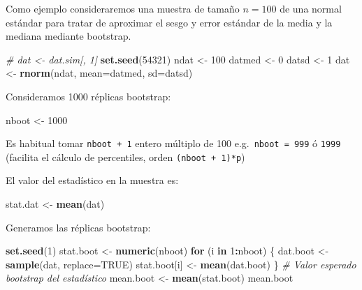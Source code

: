 \documentclass[
]{book}
\newenvironment{Shaded}{\begin{snugshade}}{\end{snugshade}}
\newcommand{\CommentTok}[1]{\textcolor[rgb]{0.56,0.35,0.01}{\textit{#1}}}
\newcommand{\ControlFlowTok}[1]{\textcolor[rgb]{0.13,0.29,0.53}{\textbf{#1}}}
\newcommand{\DataTypeTok}[1]{\textcolor[rgb]{0.13,0.29,0.53}{#1}}
\newcommand{\DecValTok}[1]{\textcolor[rgb]{0.00,0.00,0.81}{#1}}
\newcommand{\KeywordTok}[1]{\textcolor[rgb]{0.13,0.29,0.53}{\textbf{#1}}}
\newcommand{\NormalTok}[1]{#1}
\newcommand{\OperatorTok}[1]{\textcolor[rgb]{0.81,0.36,0.00}{\textbf{#1}}}
\newcommand{\OtherTok}[1]{\textcolor[rgb]{0.56,0.35,0.01}{#1}}
\newcommand{\StringTok}[1]{\textcolor[rgb]{0.31,0.60,0.02}{#1}}
\theoremstyle{break}
\theoremstyle{definition}
\theoremstyle{definition}
\theoremstyle{definition}
\theoremstyle{remark}
\begin{document}
Como ejemplo consideraremos una muestra de tamaño \(n=100\) de una normal estándar para tratar de aproximar el sesgo y error estándar de la media y la mediana mediante bootstrap.

\begin{Shaded}
\begin{Highlighting}[]
\CommentTok{# dat <- dat.sim[, 1]}
\KeywordTok{set.seed}\NormalTok{(}\DecValTok{54321}\NormalTok{)}
\NormalTok{ndat <-}\StringTok{ }\DecValTok{100}
\NormalTok{datmed <-}\StringTok{ }\DecValTok{0}
\NormalTok{datsd <-}\StringTok{ }\DecValTok{1}
\NormalTok{dat <-}\StringTok{ }\KeywordTok{rnorm}\NormalTok{(ndat, }\DataTypeTok{mean=}\NormalTok{datmed, }\DataTypeTok{sd=}\NormalTok{datsd)}
\end{Highlighting}
\end{Shaded}

Consideramos 1000 réplicas bootstrap:

\begin{Shaded}
\begin{Highlighting}[]
\NormalTok{nboot <-}\StringTok{ }\DecValTok{1000}  
\end{Highlighting}
\end{Shaded}

Es habitual tomar \texttt{nboot\ +\ 1} entero múltiplo de 100 e.g.~\texttt{nboot\ =\ 999} ó \texttt{1999}
(facilita el cálculo de percentiles, orden \texttt{(nboot\ +\ 1)*p})

El valor del estadístico en la muestra es:

\begin{Shaded}
\begin{Highlighting}[]
\NormalTok{stat.dat <-}\StringTok{ }\KeywordTok{mean}\NormalTok{(dat)}
\end{Highlighting}
\end{Shaded}

Generamos las réplicas bootstrap:

\begin{Shaded}
\begin{Highlighting}[]
\KeywordTok{set.seed}\NormalTok{(}\DecValTok{1}\NormalTok{)}
\NormalTok{stat.boot <-}\StringTok{ }\KeywordTok{numeric}\NormalTok{(nboot)}
\ControlFlowTok{for}\NormalTok{ (i }\ControlFlowTok{in} \DecValTok{1}\OperatorTok{:}\NormalTok{nboot) \{}
\NormalTok{  dat.boot <-}\StringTok{ }\KeywordTok{sample}\NormalTok{(dat, }\DataTypeTok{replace=}\OtherTok{TRUE}\NormalTok{)}
\NormalTok{  stat.boot[i] <-}\StringTok{ }\KeywordTok{mean}\NormalTok{(dat.boot)}
\NormalTok{\}}
\CommentTok{# Valor esperado bootstrap del estadístico}
\NormalTok{mean.boot <-}\StringTok{ }\KeywordTok{mean}\NormalTok{(stat.boot)  }
\NormalTok{mean.boot}
\end{Highlighting}
\end{Shaded}
\end{document}
